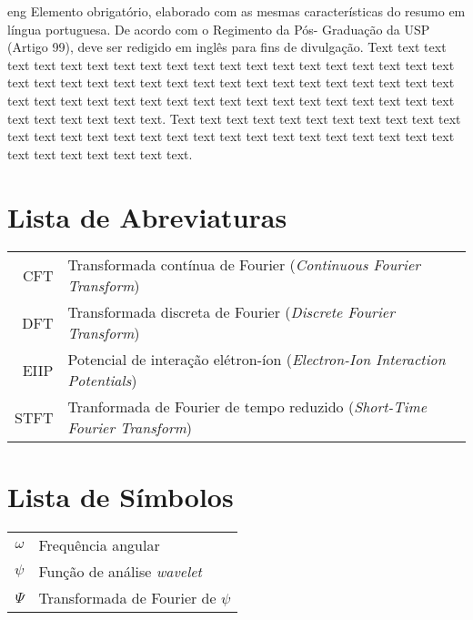 \documentclass[11pt,twoside,english,brazil]{book}
\begin{document}
\begin{resumo}{eng}
Elemento obrigatório, elaborado com as mesmas características do resumo em
língua portuguesa. De acordo com o Regimento da Pós- Graduação da USP (Artigo
99), deve ser redigido em inglês para fins de divulgação.
Text text text text text text text text text text text text text text text text
text text text text text text text text text text text text text text text text
text text text text text text text text text text text text text text text text
text text text text text text text text text text text text.
Text text text text text text text text text text text text text text text text
text text text text text text text text text text text text text text text text
text text text.
\end{resumo}




\chapter*{Lista de Abreviaturas}
\begin{tabular}{rl}
         CFT         & Transformada contínua de Fourier (\emph{Continuous Fourier Transform})\\
         DFT         & Transformada discreta de Fourier (\emph{Discrete Fourier Transform})\\
        EIIP         & Potencial de interação elétron-íon (\emph{Electron-Ion Interaction Potentials})\\
        STFT         & Tranformada de Fourier de tempo reduzido (\emph{Short-Time Fourier Transform})\\
\end{tabular}

\chapter*{Lista de Símbolos}
\begin{tabular}{rl}
        $\omega$    & Frequência angular\\
        $\psi$      & Função de análise \emph{wavelet}\\
        $\Psi$      & Transformada de Fourier de $\psi$\\
\end{tabular}
\end{document}
